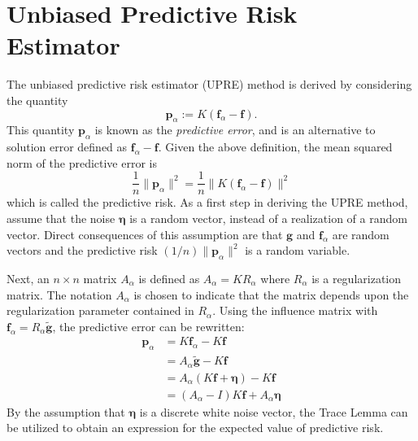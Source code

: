 \documentclass[12pt,notitlepage]{report}
\newcommand{\gVec}{\mathbf{g}}	%
\newcommand{\gnoiseVec}{\widetilde{\mathbf{g}}}	%
\newcommand{\kMat}{K}	%
\newcommand{\fVec}{\mathbf{f}}	%
\newcommand{\regparam}{\alpha}
\newcommand{\R}{R_{\regparam}}	%
\newcommand{\regf}{\fVec_{\regparam}}	%
\newcommand{\noise}{\eta}	%
\newcommand{\noiseVec}{\bm{\noise}}	%
\newcommand{\PE}{\mathbf{p}_{\regparam}}	%
\newcommand{\A}{A_{\regparam}}	%
\begin{document}
\section{Unbiased Predictive Risk Estimator} \label{sec:Unbiased Predictive Risk Estimator}
The unbiased predictive risk estimator (UPRE) method \cite{Mallows1973} is derived by considering the quantity
\[\PE := \kMat(\regf - \fVec).\]
This quantity $\PE$ is known as the \textit{predictive error}, and is an alternative to solution error defined as $\regf - \fVec$. Given the above definition, the mean squared norm of the predictive error is
\[\frac{1}{n}\|\PE\|^2 = \frac{1}{n}\|\kMat(\regf - \fVec)\|^2\]
which is called the predictive risk.  As a first step in deriving the UPRE method, assume that the noise $\noiseVec$ is a random vector, instead of a realization of a random vector. Direct consequences of this assumption are that $\gVec$ and $\regf$ are random vectors and the predictive risk $(1/n)\|\PE\|^2$ is a random variable. \par
Next, an $n \times n$ matrix $\A$ is defined as $\A = \kMat\R$ where $\R$ is a regularization matrix. The notation $\A$ is chosen to indicate that the matrix depends upon the regularization parameter contained in $\R$. Using the influence matrix with $\regf = \R\gnoiseVec$, the predictive error can be rewritten:
\begin{align*}
\PE &= \kMat\regf - \kMat\fVec \\
&= \A\gnoiseVec - \kMat\fVec \\
&= \A(\kMat\fVec + \noiseVec) - \kMat\fVec \\
&= (\A - I)\kMat\fVec + \A\noiseVec
\end{align*}
By the assumption that $\noiseVec$ is a discrete white noise vector, the Trace Lemma can be utilized to obtain an expression for the expected value of predictive risk.
\end{document}
